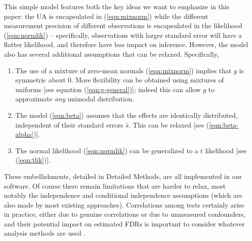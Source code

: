 \documentclass[11pt]{article}
\def\shat{\hat{s}}
\begin{document}
This simple model features both the key ideas we want to emphasize in this paper: the UA is encapsulated in (\ref{eqn:mixnorm}) while
the different measurement precision of different observations is encapsulated in the likelihood (\ref{eqn:normlik}) -- specifically, observations
with larger standard error will have a flatter likelihood, and therefore have less impact on inference.
However, the model also has several additional assumptions that can be relaxed. Specifically,
\begin{enumerate}
\item  The use of a mixture of zero-mean normals (\ref{eqn:mixnorm}) implies that $g$ is symmetric about 0.
More flexibility can be obtained using mixtures of uniforms [see equation (\ref{eqn:g-general})]; indeed this 
can allow $g$ to approximate {\it any} unimodal distribution. 
\item The model (\ref{eqn:beta}) assumes that the effects are identically distributed, independent of their standard errors $\shat$.
This can be relaxed [see (\ref{eqn:beta-alpha})].
\item The normal likelihood (\ref{eqn:normlik}) can be generalized to a $t$ likelihood [see (\ref{eqn:tlik})].
\end{enumerate}
These embellishments, detailed in Detailed Methods, are all implemented in our software.
Of course there remain limitations that are harder to relax, most notably the independence and conditional independence assumptions
(which are also made by most existing approaches). Correlations among tests certainly arise in practice, either due to genuine correlations 
or due to unmeasured confounders, and their potential impact on estimated FDRs is important to consider
whatever analysis methods are used \cite{efron2007correlation,leek:2007}.
\end{document}
